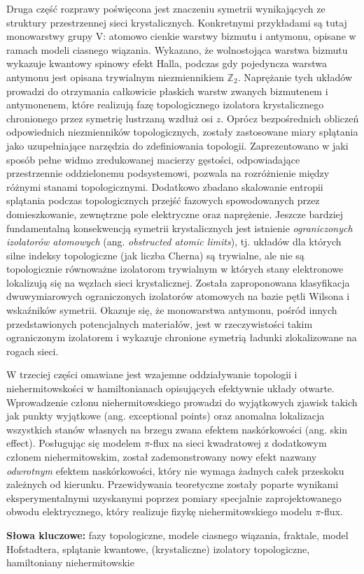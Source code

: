 \begin{otherlanguage}{polish}
Druga część rozprawy poświęcona jest znaczeniu symetrii wynikających ze struktury przestrzennej sieci krystalicznych. Konkretnymi przykładami są tutaj monowarstwy grupy V: atomowo cienkie warstwy bizmutu i antymonu, opisane w ramach modeli ciasnego wiązania. Wykazano, że wolnostojąca warstwa bizmutu wykazuje kwantowy spinowy efekt Halla, podczas gdy pojedyncza warstwa antymonu jest opisana trywialnym niezmiennikiem $\mathbb{Z}_2$. Naprężanie tych układów prowadzi do otrzymania całkowicie płaskich warstw zwanych bizmutenem i antymonenem, które realizują fazę topologicznego izolatora krystalicznego chronionego przez symetrię lustrzaną wzdłuż osi $z$. Oprócz bezpośrednich obliczeń odpowiednich niezmienników topologicznych, zostały zastosowane miary splątania jako uzupełniające narzędzia do zdefiniowania topologii. Zaprezentowano w jaki sposób pełne widmo zredukowanej macierzy gęstości, odpowiadające przestrzennie oddzielonemu podsystemowi, pozwala na rozróżnienie między różnymi stanami topologicznymi. Dodatkowo zbadano skalowanie entropii splątania podczas topologicznych przejść fazowych spowodowanych przez domieszkowanie, zewnętrzne pole elektryczne oraz naprężenie. 
Jeszcze bardziej fundamentalną konsekwencją symetrii krystalicznych jest istnienie \emph{ograniczonych izolatorów atomowych} (ang. \emph{obstructed atomic limits}), tj. układów dla których silne indeksy topologiczne (jak liczba Cherna) są trywialne, ale nie są topologicznie równoważne izolatorom trywialnym w których stany elektronowe lokalizują się na węzłach sieci krystalicznej. Została zaproponowana klasyfikacja dwuwymiarowych ograniczonych izolatorów atomowych na bazie pętli Wilsona i wskaźników symetrii. Okazuje się, że monowarstwa antymonu, pośród innych przedstawionych potencjalnych materiałów, jest w rzeczywistości takim ograniczonym izolatorem i wykazuje chronione symetrią ładunki zlokalizowane na rogach sieci.

W trzeciej części omawiane jest wzajemne oddziaływanie topologii i niehermitowskości w hamiltonianach opisujących efektywnie układy otwarte. Wprowadzenie członu niehermitowskiego prowadzi do wyjątkowych zjawisk takich jak punkty wyjątkowe (ang. exceptional points) oraz anomalna lokalizacja wszystkich stanów własnych na brzegu zwana efektem naskórkowości (ang. skin effect). Posługując się modelem $\pi$-flux na sieci kwadratowej z dodatkowym członem niehermitowskim, został zademonstrowany nowy efekt nazwany \emph{odwrotnym} efektem naskórkowości, który nie wymaga żadnych całek przeskoku zależnych od kierunku. Przewidywania teoretyczne zostały poparte wynikami eksperymentalnymi uzyskanymi poprzez pomiary specjalnie zaprojektowanego obwodu elektrycznego, który realizuje fizykę niehermitowskiego modelu $\pi$-flux.

\vspace{1cm}
\hspace{-0.4cm}\textbf{Słowa kluczowe:} fazy topologiczne, modele ciasnego wiązania, fraktale, model Hofstadtera, splątanie kwantowe, (krystaliczne) izolatory topologiczne, hamiltoniany niehermitowskie
\end{otherlanguage}

\endgroup

\vfill